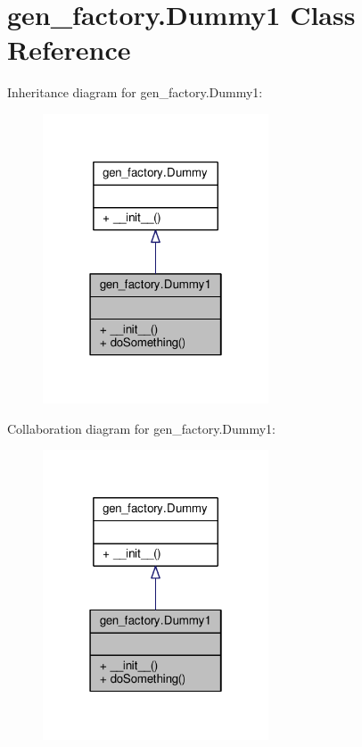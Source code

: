 \hypertarget{classgen__factory_1_1_dummy1}{}\section{gen\+\_\+factory.\+Dummy1 Class Reference}
\label{classgen__factory_1_1_dummy1}


Inheritance diagram for gen\+\_\+factory.\+Dummy1\+:\nopagebreak
\begin{figure}[H]
\begin{center}
\leavevmode
\includegraphics[width=190pt]{classgen__factory_1_1_dummy1__inherit__graph}
\end{center}
\end{figure}


Collaboration diagram for gen\+\_\+factory.\+Dummy1\+:\nopagebreak
\begin{figure}[H]
\begin{center}
\leavevmode
\includegraphics[width=190pt]{classgen__factory_1_1_dummy1__coll__graph}
\end{center}
\end{figure}
